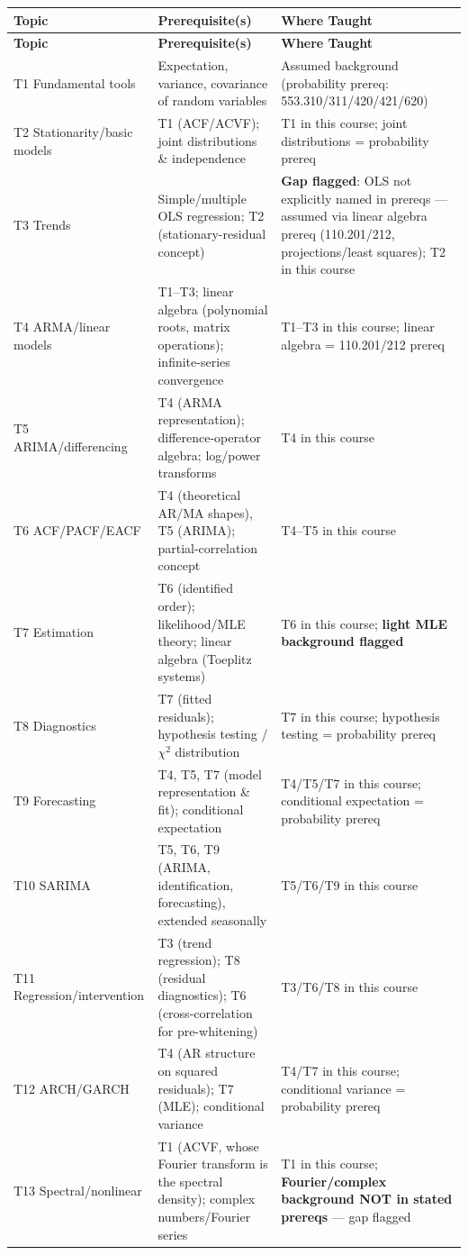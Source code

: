 \documentclass[11pt]{article}
\begin{document}
\begin{longtable}{p{4cm} p{6cm} p{5cm}}
\toprule
\textbf{Topic} & \textbf{Prerequisite(s)} & \textbf{Where Taught} \\
\midrule
\endfirsthead
\toprule
\textbf{Topic} & \textbf{Prerequisite(s)} & \textbf{Where Taught} \\
\midrule
\endhead
\bottomrule
\endfoot
T1 Fundamental tools & Expectation, variance, covariance of random variables & Assumed background (probability prereq: 553.310/311/420/421/620) \\
T2 Stationarity/basic models & T1 (ACF/ACVF); joint distributions \& independence & T1 in this course; joint distributions = probability prereq \\
T3 Trends & Simple/multiple OLS regression; T2 (stationary-residual concept) & \textbf{Gap flagged}: OLS not explicitly named in prereqs --- assumed via linear algebra prereq (110.201/212, projections/least squares); T2 in this course \\
T4 ARMA/linear models & T1--T3; linear algebra (polynomial roots, matrix operations); infinite-series convergence & T1--T3 in this course; linear algebra = 110.201/212 prereq \\
T5 ARIMA/differencing & T4 (ARMA representation); difference-operator algebra; log/power transforms & T4 in this course \\
T6 ACF/PACF/EACF & T4 (theoretical AR/MA shapes), T5 (ARIMA); partial-correlation concept & T4--T5 in this course \\
T7 Estimation & T6 (identified order); likelihood/MLE theory; linear algebra (Toeplitz systems) & T6 in this course; \textbf{light MLE background flagged} \\
T8 Diagnostics & T7 (fitted residuals); hypothesis testing / $\chi^2$ distribution & T7 in this course; hypothesis testing = probability prereq \\
T9 Forecasting & T4, T5, T7 (model representation \& fit); conditional expectation & T4/T5/T7 in this course; conditional expectation = probability prereq \\
T10 SARIMA & T5, T6, T9 (ARIMA, identification, forecasting), extended seasonally & T5/T6/T9 in this course \\
T11 Regression/intervention & T3 (trend regression); T8 (residual diagnostics); T6 (cross-correlation for pre-whitening) & T3/T6/T8 in this course \\
T12 ARCH/GARCH & T4 (AR structure on squared residuals); T7 (MLE); conditional variance & T4/T7 in this course; conditional variance = probability prereq \\
T13 Spectral/nonlinear & T1 (ACVF, whose Fourier transform is the spectral density); complex numbers/Fourier series & T1 in this course; \textbf{Fourier/complex background NOT in stated prereqs} --- gap flagged \\
\end{longtable}
\end{document}
